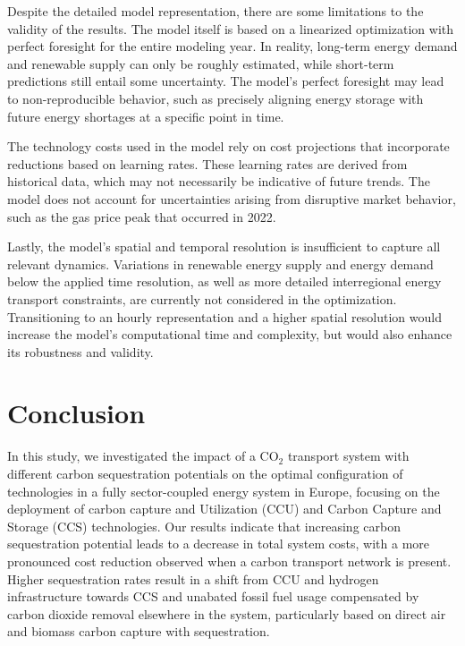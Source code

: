 \documentclass[twocolumn]{article}
\newcommand{\carbon}{CO$_2$}
\begin{document}
Despite the detailed model representation, there are some limitations to the validity of the results. The model itself is based on a linearized optimization with perfect foresight for the entire modeling year. In reality, long-term energy demand and renewable supply can only be roughly estimated, while short-term predictions still entail some uncertainty. The model's perfect foresight may lead to non-reproducible behavior, such as precisely aligning energy storage with future energy shortages at a specific point in time.

The technology costs used in the model rely on cost projections that incorporate reductions based on learning rates. These learning rates are derived from historical data, which may not necessarily be indicative of future trends. The model does not account for uncertainties arising from disruptive market behavior, such as the gas price peak that occurred in 2022.


Lastly, the model's spatial and temporal resolution is insufficient to capture all relevant dynamics. Variations in renewable energy supply and energy demand below the applied time resolution, as well as more detailed interregional energy transport constraints, are currently not considered in the optimization. Transitioning to an hourly representation and a higher spatial resolution would increase the model's computational time and complexity, but would also enhance its robustness and validity.

\section{Conclusion}
\label{sec:conclusion}

In this study, we investigated the impact of a \carbon{} transport system with different carbon sequestration potentials on the optimal configuration of technologies in a fully sector-coupled energy system in Europe, focusing on the deployment of carbon capture and Utilization (CCU) and Carbon Capture and Storage (CCS) technologies. Our results indicate that increasing carbon sequestration potential leads to a decrease in total system costs, with a more pronounced cost reduction observed when a carbon transport network is present. Higher sequestration rates result in a shift from CCU and hydrogen infrastructure towards CCS and unabated fossil fuel usage compensated by carbon dioxide removal elsewhere in the system, particularly based on direct air and biomass carbon capture with sequestration.
\end{document}
